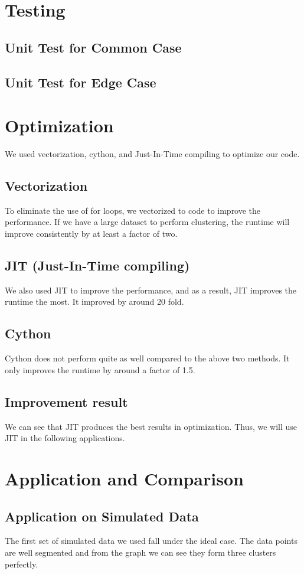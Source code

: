 \documentclass[11pt]{article}
\begin{document}
\section{Testing}
\subsection{Unit  Test for Common Case}
\subsection{Unit Test for Edge Case}

\section{Optimization}
We used vectorization, cython, and Just-In-Time compiling to optimize our code.
\subsection{Vectorization}
To eliminate the use of for loops, we vectorized to code to improve the performance. If we have a large dataset to perform clustering, the runtime will improve consistently by at least a factor of two.
\subsection{JIT (Just-In-Time compiling) }
We also used JIT to improve the performance, and as a result, JIT improves the runtime the most. It improved by around 20 fold.
\subsection{Cython}
Cython does not perform quite as well compared to the above two methods. It only improves the runtime by around a factor of 1.5.

\subsection{Improvement result}
We can see that JIT produces the best results in optimization. Thus, we will use JIT in the following applications.

\section{Application and Comparison}
\subsection{Application on Simulated Data}
The first set of simulated data we used fall under the ideal case. The data points are well segmented and from the graph we can see they form three clusters perfectly.
\end{document}
